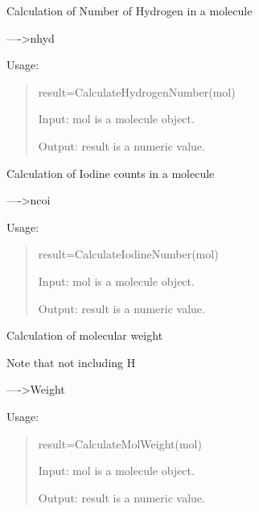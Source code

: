 \documentclass[letterpaper,10pt,english]{sphinxmanual}
\begin{document}

\begin{fulllineitems}
\label{reference/constitution:constitution.CalculateHydrogenNumber}
Calculation of Number of Hydrogen in a molecule

----\textgreater{}nhyd

Usage:
\begin{quote}

result=CalculateHydrogenNumber(mol)

Input: mol is a molecule object.

Output: result is a numeric value.
\end{quote}

\end{fulllineitems}


\begin{fulllineitems}
\label{reference/constitution:constitution.CalculateIodineNumber}
Calculation of Iodine counts in a molecule

----\textgreater{}ncoi

Usage:
\begin{quote}

result=CalculateIodineNumber(mol)

Input: mol is a molecule object.

Output: result is a numeric value.
\end{quote}

\end{fulllineitems}


\begin{fulllineitems}
\label{reference/constitution:constitution.CalculateMolWeight}
Calculation of molecular weight

Note that not including H

----\textgreater{}Weight

Usage:
\begin{quote}

result=CalculateMolWeight(mol)

Input: mol is a molecule object.

Output: result is a numeric value.
\end{quote}

\end{fulllineitems}
\end{document}
